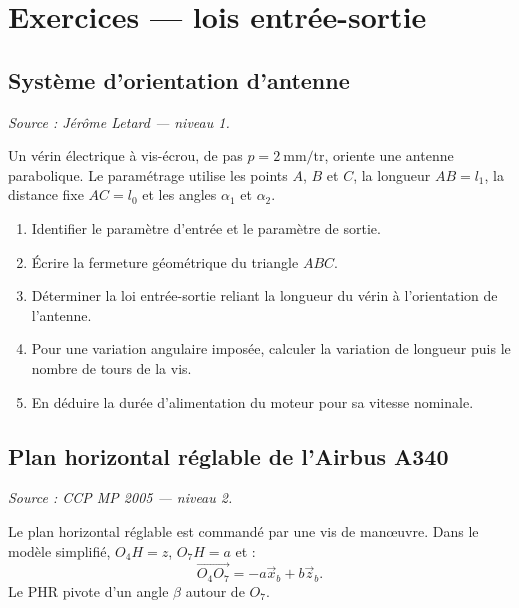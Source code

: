 
\section{Exercices — lois entrée-sortie}
\label{sec:ex-les}

\subsection{Système d'orientation d'antenne}

\textit{Source : Jérôme Letard — niveau 1.}

Un vérin électrique à vis-écrou, de pas $p=2\ \mathrm{mm/tr}$, oriente
une antenne parabolique. Le paramétrage utilise les points $A$, $B$ et
$C$, la longueur $AB=l_1$, la distance fixe $AC=l_0$ et les angles
$\alpha_1$ et $\alpha_2$.


\begin{enumerate}
  \item Identifier le paramètre d'entrée et le paramètre de sortie.
  \item Écrire la fermeture géométrique du triangle $ABC$.
  \item Déterminer la loi entrée-sortie reliant la longueur du vérin à l'orientation de l'antenne.
  \item Pour une variation angulaire imposée, calculer la variation de longueur puis le nombre de tours de la vis.
  \item En déduire la durée d'alimentation du moteur pour sa vitesse nominale.
\end{enumerate}

\subsection{Plan horizontal réglable de l'Airbus A340}

\textit{Source : CCP MP 2005 — niveau 2.}

Le plan horizontal réglable est commandé par une vis de manœuvre. Dans
le modèle simplifié, $O_4H=z$, $O_7H=a$ et :
\[
\overrightarrow{O_4O_7}=-a\vec x_b+b\vec z_b.
\]
Le PHR pivote d'un angle $\beta$ autour de $O_7$.

